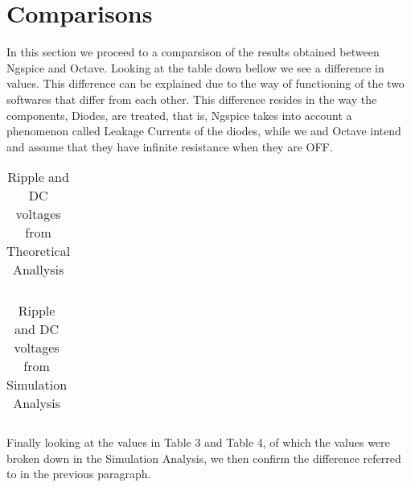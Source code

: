\section{Comparisons}
\label{sec:comparsisons}

In this section we proceed to a comparsison of the results obtained between Ngspice and Octave. Looking at the table down bellow we see a difference in values. This difference can be explained due to the way of functioning of the two softwares that differ from each other. This difference resides in the way the components, Diodes, are treated, that is, Ngspice takes into account a phenomenon called Leakage Currents of the diodes, while we and Octave intend and assume that they have infinite resistance when they are OFF.

\FloatBarrier
\begin{table}[h]
  \centering
  \begin{tabular}{|c|c|c|c|c|c|c|}
    \hline    
    
    \hline
  \end{tabular}
  \caption{Ripple and DC voltages from Theoretical Anallysis}
  \label{tab:Octave}
\end{table}
\FloatBarrier 

\FloatBarrier
\begin{table}[h]
  \centering
  \begin{tabular}{|c|c|c|}
    \hline    
    
    \hline
  \end{tabular}
  \caption{Ripple and DC voltages from Simulation Analysis}
  \label{tab:Octave}
\end{table}
\FloatBarrier 

Finally looking at the values in Table 3 and Table 4, of which the values were broken down in the Simulation Analysis, we then confirm the difference referred to in the previous paragraph.





